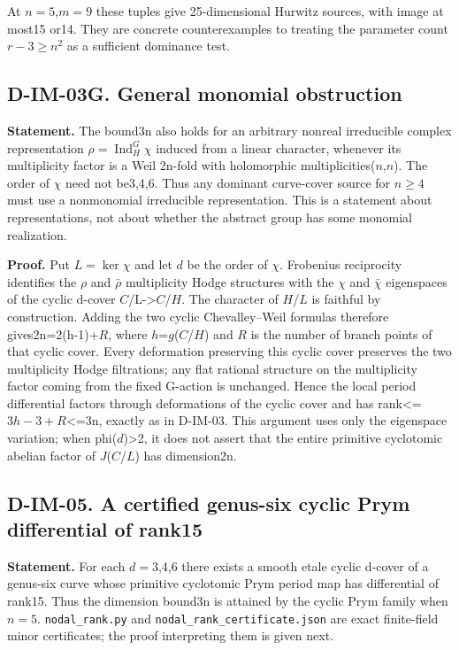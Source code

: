At \(n= 5\),\(m= 9\) these tuples give 25-dimensional Hurwitz sources, with image at most15 or14. They are concrete counterexamples to treating the parameter count \(r-3\geq n^2\) as a sufficient dominance test.

\subsection{D-IM-03G. General monomial obstruction}
\label{D-IM-03G}

\textbf{Statement.} The bound3n also holds for an arbitrary nonreal irreducible complex representation \(\rho=\operatorname{Ind}_H^G\chi\) induced from a linear character, whenever its multiplicity factor is a Weil 2n-fold with holomorphic multiplicities(\(n\),\(n\)). The order of \(\chi\) need not be3,4,6. Thus any dominant curve-cover source for \(n\geq 4\) must use a nonmonomial irreducible representation. This is a statement about representations, not about whether the abstract group has some monomial realization.

\textbf{Proof.} Put \(L=\ker\chi\) and let \(d\) be the order of \(\chi\). Frobenius reciprocity identifies the \(\rho\) and \(\bar\rho\) multiplicity Hodge structures with the \(\chi\) and \(\bar\chi\) eigenspaces of the cyclic d-cover \(C\)/L-\textgreater{}\(C\)/\(H\). The character of \(H\)/\(L\) is faithful by construction. Adding the two cyclic Chevalley--Weil formulas therefore gives2n=2(h-1)+\(R\), where \(h\)=\(g\)(\(C\)/\(H\)) and \(R\) is the number of branch points of that cyclic cover. Every deformation preserving this cyclic cover preserves the two multiplicity Hodge filtrations; any flat rational structure on the multiplicity factor coming from the fixed G-action is unchanged. Hence the local period differential factors through deformations of the cyclic cover and has rank\textless{}=\(3h-3+R\)\textless{}=3n, exactly as in D-IM-03. This argument uses only the eigenspace variation; when phi(\(d\))\textgreater{}2, it does not assert that the entire primitive cyclotomic abelian factor of \(J\)(\(C\)/\(L\)) has dimension2n.

\subsection{D-IM-05. A certified genus-six cyclic Prym differential of rank15}
\label{D-IM-05}

\textbf{Statement.} For each \(d= 3\),4,6 there exists a smooth etale cyclic d-cover of a genus-six curve whose primitive cyclotomic Prym period map has differential of rank15. Thus the dimension bound3n is attained by the cyclic Prym family when \(n= 5\). \texttt{nodal\_rank.py} and \texttt{nodal\_rank\_certificate.json} are exact finite-field minor certificates; the proof interpreting them is given next.

